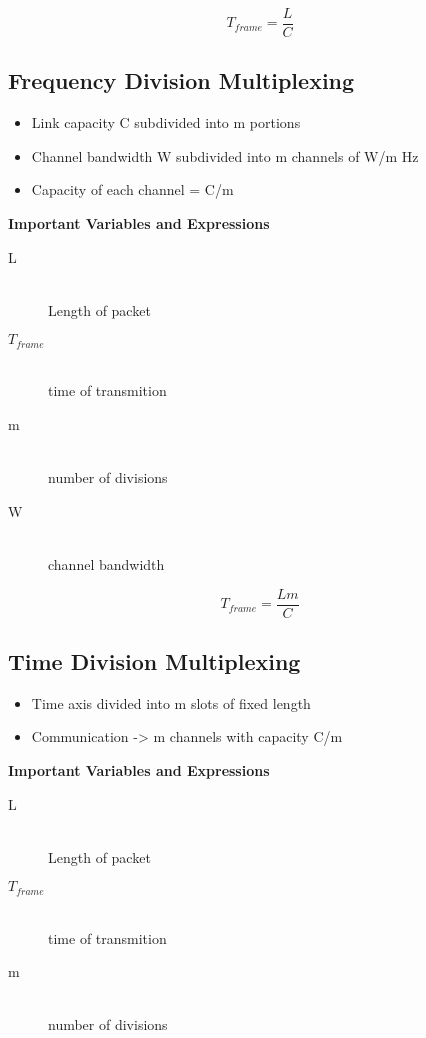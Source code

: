 \documentclass[../resumosRCOM.tex]{subfiles}
\begin{document}
\begin{equation}
    T_{frame} = \frac{L}{C}
\end{equation}

\subsection{Frequency Division Multiplexing}

\begin{itemize}
    \item Link capacity C subdivided into m portions
    \item Channel bandwidth W subdivided into m channels of W/m Hz
    \item Capacity of each channel = C/m
\end{itemize}

\textbf{Important Variables and Expressions}
\begin{description}
    \item[L] \hfill \\ Length of packet
    \item[\(T_{frame}\)] \hfill \\ time of transmition 
    \item[m] \hfill \\ number of divisions
    \item[W] \hfill \\ channel bandwidth
\end{description}

\begin{equation}
    T_{frame} = \frac{Lm}{C}
\end{equation}

\subsection{Time Division Multiplexing}

\begin{itemize}
    \item Time axis divided into m slots of fixed length
    \item Communication -> m channels with capacity C/m
\end{itemize}

\textbf{Important Variables and Expressions}
\begin{description}
    \item[L] \hfill \\ Length of packet
    \item[\(T_{frame}\)] \hfill \\ time of transmition
    \item[m] \hfill \\ number of divisions
\end{description}
\end{document}

